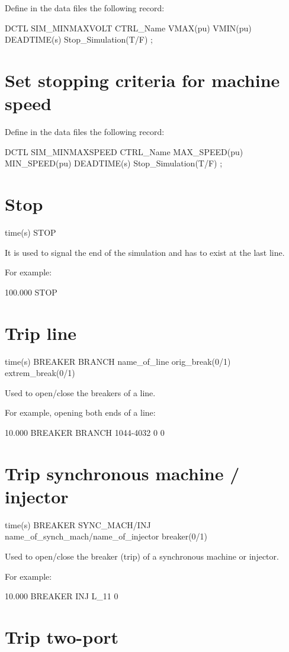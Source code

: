 Define in the data files the following record:

 DCTL SIM\_MINMAXVOLT CTRL\_Name VMAX(pu) VMIN(pu)
	DEADTIME(s) Stop\_Simulation(T/F) ;



\section{Set stopping criteria for machine speed}

Define in the data files the following record:

DCTL SIM\_MINMAXSPEED CTRL\_Name MAX\_SPEED(pu)
	MIN\_SPEED(pu) DEADTIME(s) Stop\_Simulation(T/F) ;


\section{Stop}

time(s) STOP 

It is used to signal the end of the simulation and has to exist at the last line. 

For example:

100.000 STOP 

\section{Trip line}

time(s) BREAKER BRANCH name\_of\_line orig\_break(0/1)
	extrem\_break(0/1) 
	
Used to open/close the breakers of a line. 

For example, opening both ends of a line:

10.000 BREAKER BRANCH 1044-4032 0 0 

\section{Trip synchronous machine / injector}

time(s) BREAKER SYNC\_MACH/INJ name\_of\_synch\_mach/name\_of\_injector
	breaker(0/1) 
	
Used to open/close the breaker (trip) of a synchronous machine or injector. 

For example:

10.000 BREAKER INJ L\_11 0

\section{Trip two-port}

